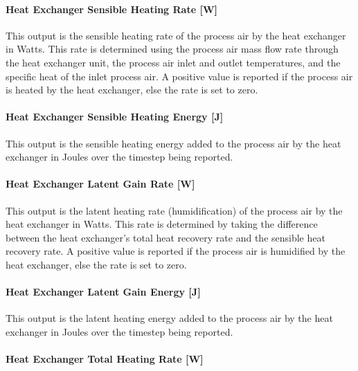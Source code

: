 \paragraph{Heat Exchanger Sensible Heating Rate {[}W{]}}\label{heat-exchanger-sensible-heating-rate-w-2}

This output is the sensible heating rate of the process air by the heat exchanger in Watts. This rate is determined using the process air mass flow rate through the heat exchanger unit, the process air inlet and outlet temperatures, and the specific heat of the inlet process air. A positive value is reported if the process air is heated by the heat exchanger, else the rate is set to zero.

\paragraph{Heat Exchanger Sensible Heating Energy {[}J{]}}\label{heat-exchanger-sensible-heating-energy-j-2}

This output is the sensible heating energy added to the process air by the heat exchanger in Joules over the timestep being reported.

\paragraph{Heat Exchanger Latent Gain Rate {[}W{]}}\label{heat-exchanger-latent-gain-rate-w-2}

This output is the latent heating rate (humidification) of the process air by the heat exchanger in Watts. This rate is determined by taking the difference between the heat exchanger's total heat recovery rate and the sensible heat recovery rate. A positive value is reported if the process air is humidified by the heat exchanger, else the rate is set to zero.

\paragraph{Heat Exchanger Latent Gain Energy {[}J{]}}\label{heat-exchanger-latent-gain-energy-j-1}

This output is the latent heating energy added to the process air by the heat exchanger in Joules over the timestep being reported.

\paragraph{Heat Exchanger Total Heating Rate {[}W{]}}\label{heat-exchanger-total-heating-rate-w-2}

